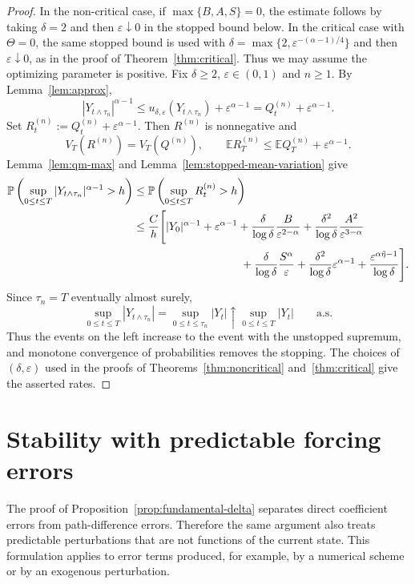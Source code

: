 \documentclass[11pt]{article}
\newcommand{\E}{\mathbb{E}}
\newcommand{\Pbb}{\mathbb{P}}
\newcommand{\1}{\mathbf{1}}
\newcommand{\wt}{\tilde}
\newcommand{\eps}{\varepsilon}
\begin{document}
\begin{proof}
In the non-critical case, if $\max\{B,A,S\}=0$, the estimate follows by taking $\delta=2$ and then $\eps\downarrow0$ in the stopped bound below. In the critical case with $\Theta=0$, the same stopped bound is used with $\delta=\max\{2,\eps^{-(\alpha-1)/4}\}$ and then $\eps\downarrow0$, as in the proof of Theorem~\ref{thm:critical}. Thus we may assume the optimizing parameter is positive. Fix $\delta\ge2$, $\eps\in(0,1)$ and $n\ge1$. By Lemma~\ref{lem:approx},
\[
  |Y_{t\wedge\tau_n}|^{\alpha-1}\le u_{\delta,\eps}(Y_{t\wedge\tau_n})+\eps^{\alpha-1}=Q_t^{(n)}+\eps^{\alpha-1}.
\]
Set $R_t^{(n)}:=Q_t^{(n)}+\eps^{\alpha-1}$. Then $R^{(n)}$ is nonnegative and
\[
  V_T(R^{(n)})=V_T(Q^{(n)}),
  \qquad
  \E R_T^{(n)}\le \E Q_T^{(n)}+\eps^{\alpha-1}.
\]
Lemma~\ref{lem:qm-max} and Lemma~\ref{lem:stopped-mean-variation} give
\begin{align*}
\Pbb\left(\sup_{0\le t\le T}|Y_{t\wedge\tau_n}|^{\alpha-1}>h\right)
&\le \Pbb\left(\sup_{0\le t\le T}R_t^{(n)}>h\right)\\
&\le \frac{C}{h}\Bigg[|Y_0|^{\alpha-1}
+\eps^{\alpha-1}
+\frac{\delta}{\log\delta}\frac{B}{\eps^{2-\alpha}}
+\frac{\delta^2}{\log\delta}\frac{A^2}{\eps^{3-\alpha}}\\
&\hspace{3.4cm}
+\frac{\delta}{\log\delta}\frac{S^\alpha}{\eps}
+\frac{\delta^2}{\log\delta}\eps^{\alpha-1}
+\frac{\eps^{\alpha\wt\eta-1}}{\log\delta}
\Bigg].
\end{align*}
Since $\tau_n=T$ eventually almost surely,
\[
  \sup_{0\le t\le T}|Y_{t\wedge\tau_n}|
  =\sup_{0\le t\le \tau_n}|Y_t|
  \uparrow \sup_{0\le t\le T}|Y_t|
  \qquad\text{a.s.}
\]
Thus the events on the left increase to the event with the unstopped supremum, and monotone convergence of probabilities removes the stopping. The choices of $(\delta,\eps)$ used in the proofs of Theorems~\ref{thm:noncritical} and~\ref{thm:critical} give the asserted rates.
\end{proof}


\section{Stability with predictable forcing errors}
\label{sec:forcing}

The proof of Proposition~\ref{prop:fundamental-delta} separates direct coefficient errors from path-difference errors. Therefore the same argument also treats predictable perturbations that are not functions of the current state. This formulation applies to error terms produced, for example, by a numerical scheme or by an exogenous perturbation.
\end{document}
